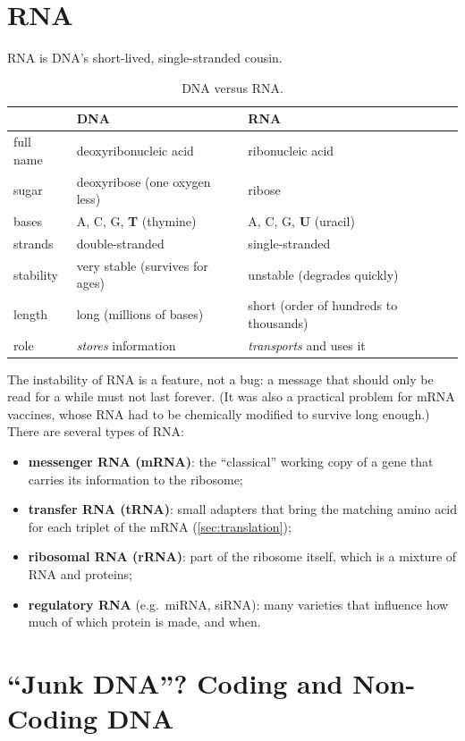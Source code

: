 \documentclass[11pt, oneside]{book}
\let\originalsection\section
\renewcommand{\section}{\Needspace{7\baselineskip}\originalsection}
\begin{document}
\section{RNA}

RNA is DNA's short-lived, single-stranded cousin.

\begin{table}[htbp]
\centering
\small
\begin{tabular}{@{}lll@{}}
\toprule
 & \textbf{DNA} & \textbf{RNA} \\
\midrule
full name & deoxyribonucleic acid & ribonucleic acid \\
sugar & deoxyribose (one oxygen less) & ribose \\
bases & A, C, G, \textbf{T} (thymine) & A, C, G, \textbf{U} (uracil) \\
strands & double-stranded & single-stranded \\
stability & very stable (survives for ages) & unstable (degrades quickly) \\
length & long (millions of bases) & short (order of hundreds to thousands) \\
role & \emph{stores} information & \emph{transports} and uses it \\
\bottomrule
\end{tabular}
\caption{DNA versus RNA.}
\label{tab:dna-rna}
\end{table}

The instability of RNA is a feature, not a bug: a message that should only
be read for a while must not last forever. (It was also a practical problem
for mRNA vaccines, whose RNA had to be chemically modified to survive long
enough.) There are several types of RNA:
\begin{itemize}
  \item \textbf{messenger RNA (mRNA)}: the ``classical'' working copy of a
    gene that carries its information to the ribosome;
  \item \textbf{transfer RNA (tRNA)}: small adapters that bring the matching
    amino acid for each triplet of the mRNA (\cref{sec:translation});
  \item \textbf{ribosomal RNA (rRNA)}: part of the ribosome itself, which is a
    mixture of RNA and proteins;
  \item \textbf{regulatory RNA} (e.g.\ miRNA, siRNA): many varieties that
    influence how much of which protein is made, and when.
\end{itemize}

\section{``Junk DNA''? Coding and Non-Coding DNA}
\end{document}

